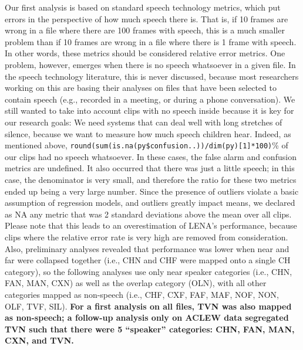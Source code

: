 \documentclass[english,floatsintext,man]{apa6}
\begin{document}
Our first analysis is based on standard speech technology metrics, which
put errors in the perspective of how much speech there is. That is, if
10 frames are wrong in a file where there are 100 frames with speech,
this is a much smaller problem than if 10 frames are wrong in a file
where there is 1 frame with speech. In other words, these metrics should
be considered relative error metrics. One problem, however, emerges when
there is no speech whatsoever in a given file. In the speech technology
literature, this is never discussed, because most researchers working on
this are basing their analyses on files that have been selected to
contain speech (e.g., recorded in a meeting, or during a phone
conversation). We still wanted to take into account clips with no speech
inside because it is key for our research goals: We need systems that
can deal well with long stretches of silence, because we want to measure
how much speech children hear. Indeed, as mentioned above,
\texttt{round(sum(is.na(py\$confusion..))/dim(py){[}1{]}*100)}\% of our
clips had no speech whatsoever. In these cases, the false alarm and
confusion metrics are undefined. It also occurred that there was just a
little speech; in this case, the denominator is very small, and
therefore the ratio for these two metrics ended up being a very large
number. Since the presence of outliers violate a basic assumption of
regression models, and outliers greatly impact means, we declared as NA
any metric that was 2 standard deviations above the mean over all clips.
Please note that this leads to an overestimation of LENA's performance,
because clips where the relative error rate is very high are removed
from consideration. Also, preliminary analyses revealed that performance
was lower when near and far were collapsed together (i.e., CHN and CHF
were mapped onto a single CH category), so the following analyses use
only near speaker categories (i.e., CHN, FAN, MAN, CXN) as well as the
overlap category (OLN), with all other categories mapped as non-speech
(i.e., CHF, CXF, FAF, MAF, NOF, NON, OLF, TVF, SIL). \textbf{For a first
analysis on all files, TVN was also mapped as non-speech; a follow-up
analysis only on ACLEW data segregated TVN such that there were 5
\enquote{speaker} categories: CHN, FAN, MAN, CXN, and TVN.}
\end{document}
